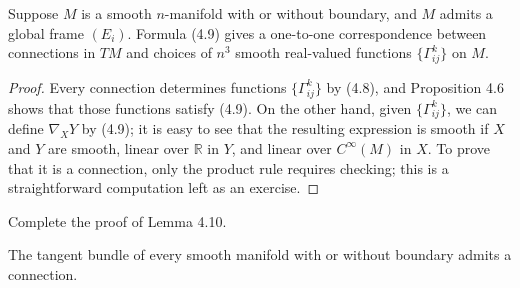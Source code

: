 \begin{lemma}
\label{lem:connections-from-connection-coefficients}
Suppose $M$ is a smooth $n$-manifold with or without boundary, and $M$ admits a global frame $(E_i)$. Formula (4.9) gives a one-to-one correspondence between connections in $TM$ and choices of $n^3$ smooth real-valued functions $\{\Gamma^k_{ij}\}$ on $M$.
\end{lemma}

\begin{proof}
Every connection determines functions $\{\Gamma^k_{ij}\}$ by (4.8), and Proposition 4.6 shows that those functions satisfy (4.9). On the other hand, given $\{\Gamma^k_{ij}\}$, we can define $\nabla_X Y$ by (4.9); it is easy to see that the resulting expression is smooth if $X$ and $Y$ are smooth, linear over $\mathbb{R}$ in $Y$, and linear over $C^\infty(M)$ in $X$. To prove that it is a connection, only the product rule requires checking; this is a straightforward computation left as an exercise.
\end{proof}

\begin{exercise}
\label{exer:complete-proof-lemma-4.10}
Complete the proof of Lemma 4.10.
\end{exercise}

\begin{proposition}
\label{prop:tangent-bundle-admits-connection}
The tangent bundle of every smooth manifold with or without boundary admits a connection.
\end{proposition}

